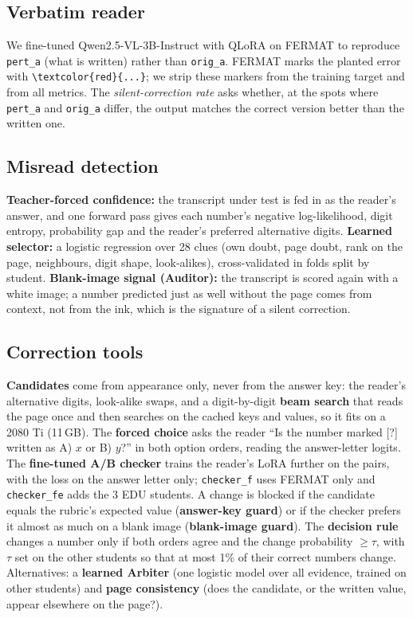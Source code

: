 \documentclass[11pt]{article}
\newcommand{\tool}[1]{\texttt{\small #1}}
\begin{document}
\subsection{Verbatim reader}
We fine-tuned Qwen2.5-VL-3B-Instruct with QLoRA on FERMAT to reproduce \tool{pert\_a} (what is written) rather than \tool{orig\_a}. FERMAT marks the planted error with \verb|\textcolor{red}{...}|; we strip these markers from the training target and from all metrics. The \emph{silent-correction rate} asks whether, at the spots where \tool{pert\_a} and \tool{orig\_a} differ, the output matches the correct version better than the written one.

\subsection{Misread detection}
\textbf{Teacher-forced confidence:} the transcript under test is fed in as the reader's answer, and one forward pass gives each number's negative log-likelihood, digit entropy, probability gap and the reader's preferred alternative digits. \textbf{Learned selector:} a logistic regression over 28 clues (own doubt, page doubt, rank on the page, neighbours, digit shape, look-alikes), cross-validated in folds split by student. \textbf{Blank-image signal (Auditor):} the transcript is scored again with a white image; a number predicted just as well without the page comes from context, not from the ink, which is the signature of a silent correction.

\subsection{Correction tools}
\textbf{Candidates} come from appearance only, never from the answer key: the reader's alternative digits, look-alike swaps, and a digit-by-digit \textbf{beam search} that reads the page once and then searches on the cached keys and values, so it fits on a 2080 Ti (11\,GB). The \textbf{forced choice} asks the reader ``Is the number marked [?] written as A) $x$ or B) $y$?'' in both option orders, reading the answer-letter logits. The \textbf{fine-tuned A/B checker} trains the reader's LoRA further on the pairs, with the loss on the answer letter only; \tool{checker\_f} uses FERMAT only and \tool{checker\_fe} adds the 3 EDU students. A change is blocked if the candidate equals the rubric's expected value (\textbf{answer-key guard}) or if the checker prefers it almost as much on a blank image (\textbf{blank-image guard}). The \textbf{decision rule} changes a number only if both orders agree and the change probability $\geq\tau$, with $\tau$ set on the other students so that at most 1\% of their correct numbers change. Alternatives: a \textbf{learned Arbiter} (one logistic model over all evidence, trained on other students) and \textbf{page consistency} (does the candidate, or the written value, appear elsewhere on the page?).
\end{document}
